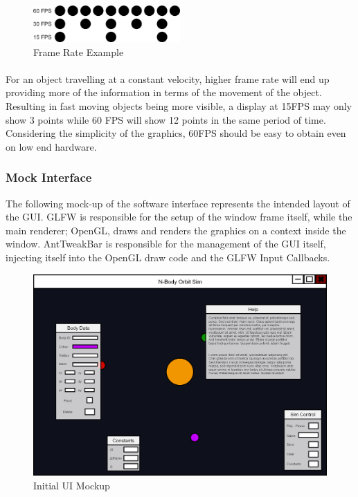 \begin{figure}
  \centering
  \includegraphics[width=0.5\textwidth]{img/framerate.png}
  \caption{Frame Rate Example}
\end{figure}

\paragraph{}
For an object travelling at a constant velocity, higher frame rate will end up providing more of the information in terms of the movement of the object. Resulting in fast moving objects being more visible, a display at 15FPS may only show 3 points while 60 FPS will show 12 points in the same period of time. Considering the simplicity of the graphics, 60FPS should be easy to obtain even on low end hardware.

\subsubsection{Mock Interface}
The following mock-up of the software interface represents the intended layout of the GUI. GLFW is responsible for the setup of the window frame itself, while the main renderer; OpenGL, draws and renders the graphics on a context inside the window. AntTweakBar is responsible for the management of the GUI itself, injecting itself into the OpenGL draw code and the GLFW Input Callbacks.

\begin{figure}[!ht]
  \centering
  \includegraphics[width=\textwidth]{img/uiex.png}
  \caption{Initial UI Mockup}
\end{figure}

